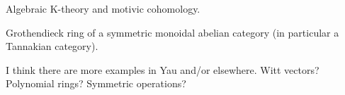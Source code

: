 \begin{example}
Algebraic K-theory and motivic cohomology.
\end{example}

\begin{example}
Grothendieck ring of a symmetric monoidal abelian category (in particular a Tannakian category).
\end{example}

\begin{example}
I think there are more examples in Yau and/or elsewhere. Witt vectors? Polynomial rings? Symmetric operations?
\end{example}
